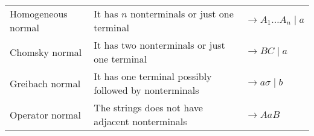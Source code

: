 \begin{table}[H]
{\begin{tabular}{lll}
    Homogeneous normal                & It has $n$ nonterminals or just one terminal                & $\rightarrow A_1 \dots A_n \mid a$        \\
    Chomsky normal                    & It has two nonterminals or just one terminal                & $\rightarrow BC\mid a$                     \\
    Greibach normal                   & It has one terminal possibly followed by nonterminals       & $\rightarrow a \sigma\mid b$               \\
    Operator normal                   & The strings does not have adjacent nonterminals             & $\rightarrow AaB$                      \\ \hline
    \end{tabular}%
    }
\end{table}